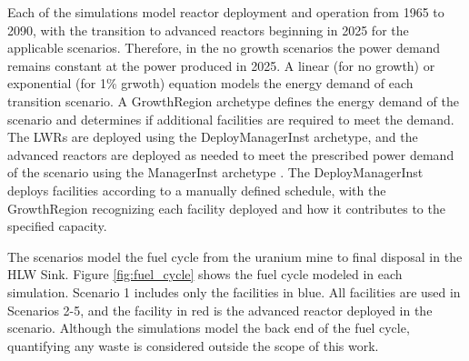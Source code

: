Each of the simulations model reactor deployment and operation from 1965 to 
2090, with the transition to advanced reactors beginning 
in 2025 for the applicable scenarios. Therefore, in the no growth scenarios 
the power demand remains constant 
at the power produced in 2025. A linear (for no growth) or exponential 
(for 1\% grwoth) equation models the energy demand of each transition 
scenario. A \Cycamore GrowthRegion archetype\cite{huff_fundamental_2016}
defines the energy demand of the scenario and determines if additional 
facilities are required to meet the demand. The \glspl{LWR} are deployed 
using the \Cycamore DeployManagerInst archetype, and the 
advanced reactors are deployed as needed to meet the prescribed power demand 
of the scenario using the \Cycamore ManagerInst archetype 
\cite{huff_fundamental_2016}. The \Cycamore DeployManagerInst deploys facilities 
according to a manually defined schedule, with the \Cycamore GrowthRegion 
recognizing each facility deployed and how it contributes 
to the specified capacity. 

The scenarios model the fuel cycle from the uranium mine to final 
disposal in the \gls{HLW} Sink. Figure 
\ref{fig:fuel_cycle} shows the fuel cycle modeled in each simulation. Scenario 
1 includes only the facilities in blue. All facilities are used in Scenarios 
2-5, and the facility in red is the advanced reactor deployed in the 
scenario. Although the simulations model the back end of the fuel 
cycle, quantifying any waste is considered outside the 
scope of this work. 

